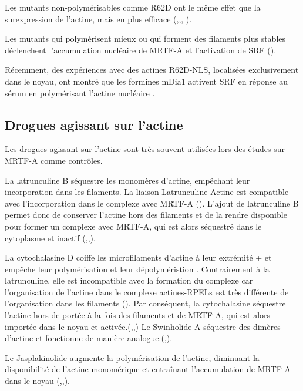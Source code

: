 Les mutants non-polymérisables comme R62D ont le même effet que la surexpression de l'actine, mais en plus efficace (\cite{posern_mutant_2002},\cite{miralles_actin_2003},\cite{vartiainen_nuclear_2007}, \cite{collard_nuclear_2014}). 

Les mutants qui polymérisent mieux ou qui forment des filaments plus stables déclenchent l'accumulation nucléaire de MRTF-A et l'activation de SRF (\cite{posern_mutant_2004}). 

Récemment, des expériences avec des actines R62D-NLS, localisées exclusivement dans le noyau, ont montré que les formines mDia1 activent SRF en réponse au sérum en polymérisant l'actine nucléaire \parencite{baarlink_nuclear_2013}. 


\subsection{Drogues agissant sur l'actine}

Les drogues agissant sur l'actine sont très souvent utilisées lors des études sur MRTF-A comme contrôles. 

La latrunculine B séquestre les monomères d'actine, empêchant leur incorporation dans les filaments. La liaison Latrunculine-Actine est compatible avec l'incorporation dans le complexe avec MRTF-A (\cite{mouilleron_molecular_2008}). 
L'ajout de latrunculine B permet donc de conserver l'actine hors des filaments et de la rendre disponible pour former un complexe avec MRTF-A, qui est alors séquestré dans le cytoplasme et inactif (\cite{vartiainen_nuclear_2007},\cite{zhao_force_2007},\cite{smith_induction_2013}). 

La cytochalasine D coiffe les microfilaments d'actine à leur extrémité + et empêche leur polymérisation et leur dépolyméristion . 
Contrairement à la latrunculine, elle est incompatible avec la formation du complexe car l'organisation de l'actine dans le complexe actines-RPELs est très différente de l'organisation dans les filaments (\cite{treisman_structure_2011}). 
Par conséquent, la cytochalasine séquestre l'actine hors de portée à la fois des filaments et de MRTF-A, qui est alors importée dans le noyau et activée.(\cite{miralles_actin_2003},\cite{vartiainen_nuclear_2007},\cite{smith_induction_2013}) Le Swinholide A séquestre des dimères d'actine et fonctionne de manière analogue.(\cite{miralles_actin_2003},\cite{vartiainen_nuclear_2007}).

Le Jasplakinolide augmente la polymérisation de l'actine, diminuant la disponibilité de l'actine monomérique et entraînant l'accumulation de MRTF-A dans le noyau (\cite{miralles_actin_2003},\cite{vartiainen_nuclear_2007},\cite{smith_induction_2013}). 


